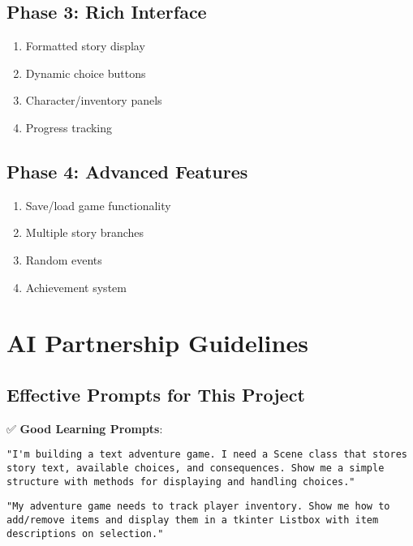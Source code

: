 \documentclass[
  letterpaper,
  DIV=11,
  numbers=noendperiod,
  oneside]{scrreprt}
\providecommand{\tightlist}{%
  \setlength{\itemsep}{0pt}\setlength{\parskip}{0pt}}\usepackage{longtable,booktabs,array}
\begin{document}
\subsection{Phase 3: Rich Interface}\label{phase-3-rich-interface}

\begin{enumerate}
\def\labelenumi{\arabic{enumi}.}
\tightlist
\item
  Formatted story display
\item
  Dynamic choice buttons
\item
  Character/inventory panels
\item
  Progress tracking
\end{enumerate}

\subsection{Phase 4: Advanced Features}\label{phase-4-advanced-features}

\begin{enumerate}
\def\labelenumi{\arabic{enumi}.}
\tightlist
\item
  Save/load game functionality
\item
  Multiple story branches
\item
  Random events
\item
  Achievement system
\end{enumerate}

\section{AI Partnership Guidelines}\label{ai-partnership-guidelines-10}

\subsection{Effective Prompts for This
Project}\label{effective-prompts-for-this-project-10}

✅ \textbf{Good Learning Prompts}:

\begin{verbatim}
"I'm building a text adventure game. I need a Scene class that stores 
story text, available choices, and consequences. Show me a simple 
structure with methods for displaying and handling choices."
\end{verbatim}

\begin{verbatim}
"My adventure game needs to track player inventory. Show me how to 
add/remove items and display them in a tkinter Listbox with item 
descriptions on selection."
\end{verbatim}
\end{document}
